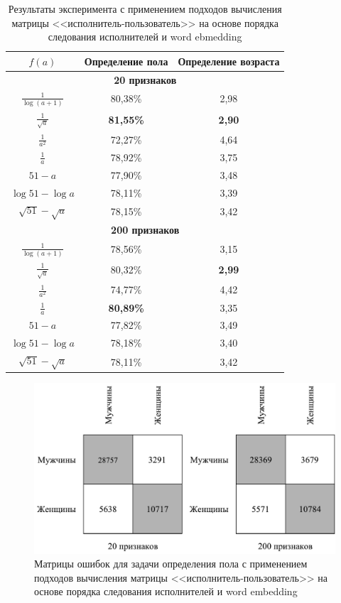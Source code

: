 \begin{table}[!h]
    \caption{Результаты эксперимента с применением подходов
             вычисления матрицы <<исполнитель-пользователь>>
             на основе порядка следования исполнителей 
             и word ebmedding}
    \label{tab:order_we}
\centering
\begin{tabular}{|c|c|c|}\hline
    \boldmath$f(a)$ & \textbf{Определение пола} & \textbf{Определение возраста} \\\hline
    \multicolumn{3}{|c|}{\textbf{20 признаков}} \\\hline
    $\frac{1}{\log(a + 1)}$ & 80,38\% & 2,98 \\\hline
    $\frac{1}{\sqrt{a}}$ & \textbf{81,55\%} & \textbf{2,90} \\\hline
    $\frac{1}{a^2}$ & 72,27\% & 4,64 \\\hline
    $\frac{1}{a}$ & 78,92\% & 3,75 \\\hline
    $51 - a$ & 77,90\% & 3,48 \\\hline
    $\log{51} - \log{a}$ & 78,11\% & 3,39 \\\hline
    $\sqrt{51} - \sqrt{a}$ & 78,15\% & 3,42 \\\hline
    \multicolumn{3}{|c|}{\textbf{200 признаков}} \\\hline
    $\frac{1}{\log(a + 1)}$ & 78,56\% & 3,15 \\\hline
    $\frac{1}{\sqrt{a}}$ & 80,32\% & \textbf{2,99} \\\hline
    $\frac{1}{a^2}$ & 74,77\% & 4,42 \\\hline
    $\frac{1}{a}$ & \textbf{80,89\%} & 3,35 \\\hline
    $51 - a$ & 77,82\% & 3,49 \\\hline
    $\log{51} - \log{a}$ & 78,18\% & 3,40 \\\hline
    $\sqrt{51} - \sqrt{a}$ & 78,11\% & 3,42 \\\hline
\end{tabular}
\end{table}

\begin{figure}[!h]
\caption{Матрицы ошибок для задачи определения пола с
         применением подходов вычисления матрицы 
         <<исполнитель-пользователь>> на основе порядка следования
         исполнителей и word embedding}
\label{fig:order_we_conf}
\centering
\includegraphics[scale=0.75]{figs/order-we-confusion.pdf}
\end{figure}

